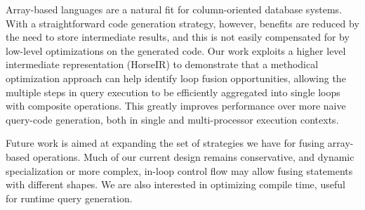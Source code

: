 Array-based languages are a natural fit for column-oriented database systems.  With a straightforward code generation strategy, however, benefits are reduced by the need to store intermediate results, and this is not easily compensated for by low-level optimizations on the generated code.  Our work exploits a higher level intermediate representation (HorseIR) to demonstrate that a methodical optimization approach can help identify loop fusion opportunities, allowing the multiple steps in query execution to be efficiently aggregated into single loops with composite operations. This greatly improves performance over more naive query-code generation, both in single and multi-processor execution contexts.

Future work is aimed at expanding the set of strategies we have for fusing array-based operations.  Much of our current design remains conservative, and dynamic specialization or more complex, in-loop control flow may allow fusing statements with different shapes.  We are also interested in optimizing compile time, useful for runtime query generation.
